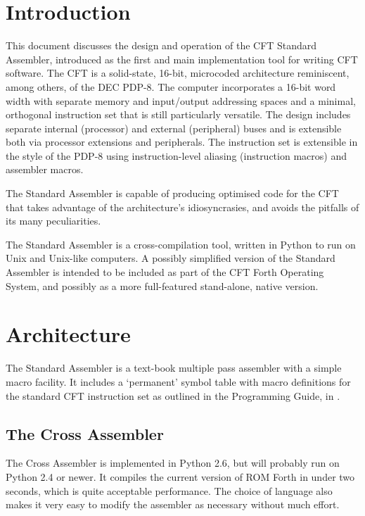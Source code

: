 \section{Introduction}

  This document discusses the design and operation of the CFT Standard
  Assembler, introduced as the first and main implementation tool for
  writing CFT software. The CFT is a solid-state, 16-bit, microcoded
  architecture reminiscent, among others, of the DEC PDP-8. The
  computer incorporates a 16-bit word width with separate memory and
  input/output addressing spaces and a minimal, orthogonal instruction
  set that is still particularly versatile. The design includes
  separate internal (processor) and external (peripheral) buses and is
  extensible both via processor extensions and peripherals. The
  instruction set is extensible in the style of the PDP-8 using
  instruction-level aliasing (instruction macros) and assembler macros.

  The Standard Assembler is capable of producing optimised code for
  the CFT that takes advantage of the architecture's idiosyncrasies,
  and avoids the pitfalls of its many peculiarities.

  The Standard Assembler is a cross-compilation tool, written in
  Python to run on Unix and Unix-like computers. A possibly simplified
  version of the Standard Assembler is intended to be included as part
  of the CFT Forth Operating System, and possibly as a more
  full-featured stand-alone, native version.

\section{Architecture}

The Standard Assembler is a text-book multiple pass assembler with a
simple macro facility. It includes a ‘permanent’ symbol table with
macro definitions for the standard CFT instruction set as outlined in
the Programming Guide, in .

\subsection{The Cross Assembler}

The Cross Assembler is implemented in Python 2.6, but will probably run on
Python 2.4 or newer. It compiles the current version of ROM Forth in under two
seconds, which is quite acceptable performance. The choice of language also
makes it very easy to modify the assembler as necessary without much effort.

